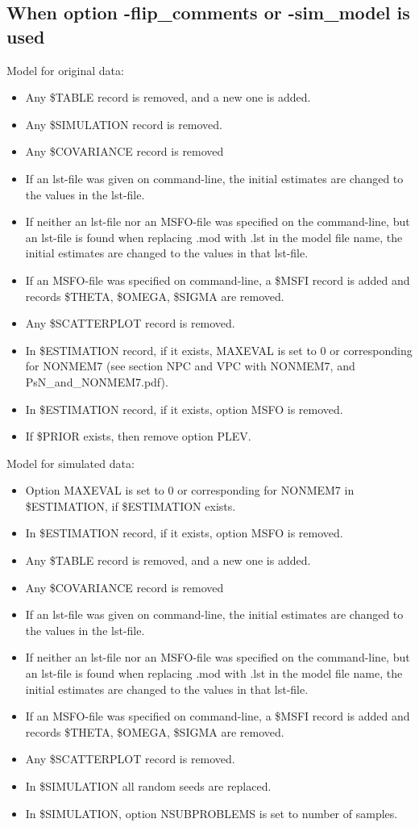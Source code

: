 \subsection{When option -flip\_comments or -sim\_model is used}
Model for original data:  
\begin{itemize}
	\item Any \$TABLE record is removed, and a new one is added.
	\item Any \$SIMULATION record is removed.
	\item Any \$COVARIANCE record is removed
	\item If an lst-file was given on command-line, the initial estimates are changed to the values in the lst-file. 
	\item If neither an lst-file nor an MSFO-file was specified on the command-line, but an lst-file is found when replacing .mod with .lst in the model file name, the initial estimates are changed to the values in that lst-file.
	\item If an MSFO-file was specified on command-line, a \$MSFI record is added and records \$THETA, \$OMEGA, \$SIGMA are removed.  
	\item Any \$SCATTERPLOT record is removed.
	\item In \$ESTIMATION record, if it exists, MAXEVAL is set to 0 or corresponding for  NONMEM7 (see section NPC and VPC with NONMEM7, and PsN\_and\_NONMEM7.pdf).
	\item In \$ESTIMATION record, if it exists, option MSFO is removed.
	\item If \$PRIOR exists, then remove option PLEV.
\end{itemize}

Model for simulated data:
\begin{itemize}
	\item Option MAXEVAL is set to 0 or corresponding for  NONMEM7 in \$ESTIMATION, if \$ESTIMATION exists.
	\item In \$ESTIMATION record, if it exists, option MSFO is removed.
	\item Any \$TABLE record is removed, and a new one is added.
	\item Any \$COVARIANCE record is removed
	\item If an lst-file was given on command-line, the initial estimates are changed to the values in the lst-file. 
	\item If neither an lst-file nor an MSFO-file was specified on the command-line, but an lst-file is found when replacing .mod with .lst in the model file name, the initial estimates are changed to the values in that lst-file.
	\item If an MSFO-file was specified on command-line, a \$MSFI record is added and records \$THETA, \$OMEGA, \$SIGMA are removed.  
	\item Any \$SCATTERPLOT record is removed.
	\item In \$SIMULATION all random seeds are replaced.      
	\item In \$SIMULATION, option NSUBPROBLEMS is set to number of samples.
\end{itemize}

